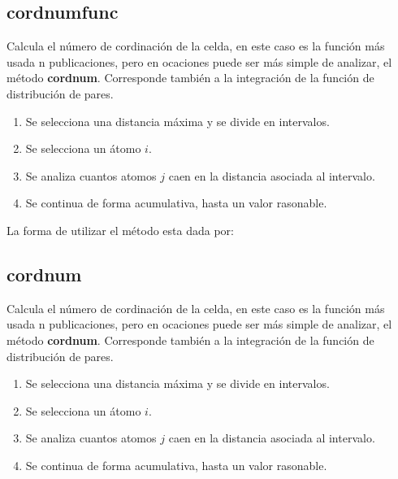 \subsection{cordnumfunc}
Calcula el n\'umero de cordinaci\'on de la celda, en este caso es la funci\'on m\'as usada n publicaciones, pero en ocaciones puede ser m\'as simple de analizar, el m\'etodo \textbf{cordnum}. Corresponde tambi\'en a la integraci\'on de la funci\'on de distribuci\'on de pares.
\begin{enumerate}
 \item Se selecciona una distancia m\'axima y se divide en intervalos.
 \item Se selecciona un \'atomo $i$.
 \item Se analiza cuantos atomos $j$ caen en la distancia asociada al intervalo.
 \item Se continua de forma acumulativa, hasta un valor rasonable.
\end{enumerate}

La forma de utilizar el m\'etodo esta dada por:


\subsection{cordnum}
Calcula el n\'umero de cordinaci\'on de la celda, en este caso es la funci\'on m\'as usada n publicaciones, pero en ocaciones puede ser m\'as simple de analizar, el m\'etodo \textbf{cordnum}. Corresponde tambi\'en a la integraci\'on de la funci\'on de distribuci\'on de pares.
\begin{enumerate}
 \item Se selecciona una distancia m\'axima y se divide en intervalos.
 \item Se selecciona un \'atomo $i$.
 \item Se analiza cuantos atomos $j$ caen en la distancia asociada al intervalo.
 \item Se continua de forma acumulativa, hasta un valor rasonable.
\end{enumerate}

